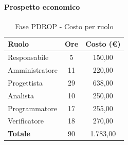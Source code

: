 \documentclass[../PianoProgetto.tex]{subfiles}
\begin{document}
	\paragraph{Prospetto economico}
					
	\begin{table}[h]
		\centering
	
		\begin{tabular}{l * {2}{c}}
			\toprule
			\textbf{Ruolo} & \textbf{Ore} & \textbf{Costo (\euro{})} \\
			\midrule
			Responsabile &	5 & 150,00 \\
			Amministratore & 11 & 220,00 \\
			Progettista & 29 & 638,00 \\
			Analista & 10 & 250,00 \\
			Programmatore & 17 & 255,00 \\
			Verificatore & 18 & 270,00 \\
			\midrule		
			\textbf{Totale} & 90 & 1.783,00 \\
			\bottomrule
		\end{tabular}
		\caption{Fase PDROP - Costo per ruolo}
		\label{tab:fasePDROP_costo}
	\end{table}
\vfill	
\newpage
\vfill	
	
\end{document}
